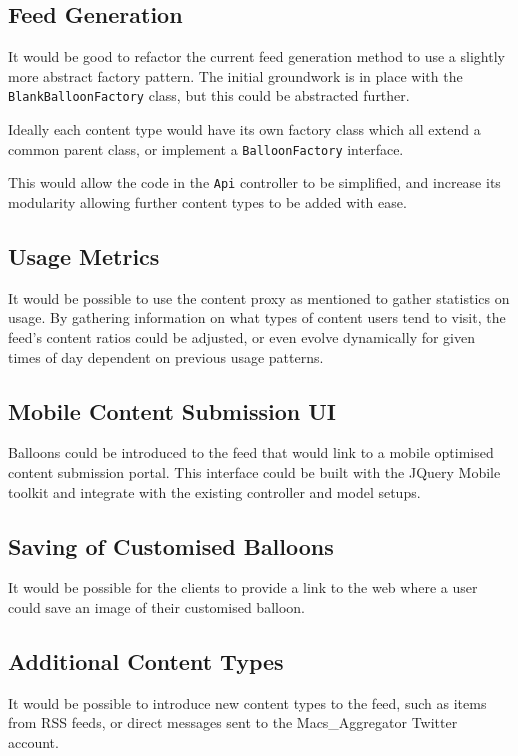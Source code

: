 \documentclass[11pt]{article}
\begin{document}
\subsection{Feed Generation}
It would be good to refactor the current feed generation method to use a slightly more abstract factory pattern. The initial groundwork is in place with the \texttt{BlankBalloonFactory} class, but this could be abstracted further.

Ideally each content type would have its own factory class which all extend a common parent class, or implement a \texttt{BalloonFactory} interface.

This would allow the code in the \texttt{Api} controller to be simplified, and increase its modularity allowing further content types to be added with ease.

\subsection{Usage Metrics}
It would be possible to use the content proxy as mentioned to gather statistics on usage. By gathering information on what types of content users tend to visit, the feed's content ratios could be adjusted, or even evolve dynamically for given times of day dependent on previous usage patterns.

\subsection{Mobile Content Submission UI}
Balloons could be introduced to the feed that would link to a mobile optimised content submission portal. This interface could be built with the JQuery Mobile toolkit and integrate with the existing controller and model setups.

\subsection{Saving of Customised Balloons}
It would be possible for the clients to provide a link to the web where a user could save an image of their customised balloon.

\subsection{Additional Content Types}
It would be possible to introduce new content types to the feed, such as items from RSS feeds, or direct messages sent to the Macs\_Aggregator Twitter account.
\end{document}

